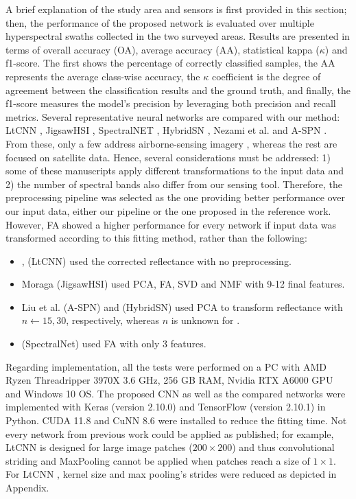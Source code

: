 A brief explanation of the study area and sensors is first provided in this section; then, the performance of the proposed network is evaluated over multiple hyperspectral swaths collected in the two surveyed areas. Results are presented in terms of overall accuracy (OA), average accuracy (AA), statistical kappa ($\kappa$) and f1-score. The first shows the percentage of correctly classified samples, the AA represents the average class-wise accuracy, the $\kappa$ coefficient is the degree of agreement between the classification results and the ground truth, and finally, the f1-score measures the model's precision by leveraging both precision and recall metrics. Several representative neural networks are compared with our method: LtCNN \cite{liu_plant_2022}, JigsawHSI \cite{moraga_jigsawhsi_2022}, SpectralNET \cite{chakraborty_spectralnet_2021}, HybridSN \cite{roy_hybridsn_2020}, Nezami et al. \cite{nezami_tree_2020} and A-SPN \cite{xue_attention-based_2021}. From these, only a few address airborne-sensing imagery \cite{liu_plant_2022}, whereas the rest are focused on satellite data. Hence, several considerations must be addressed: 1) some of these manuscripts apply different transformations to the input data and 2) the number of spectral bands also differ from our sensing tool. Therefore, the preprocessing pipeline was selected as the one providing better performance over our input data, either our pipeline or the one proposed in the reference work. However, FA showed a higher performance for every network if input data was transformed according to this fitting method, rather than the following: 
\begin{itemize}
    \item \cite{nezami_tree_2020}, \cite{li_faster_2022} (LtCNN) used the corrected reflectance with no preprocessing. 
    \item Moraga \cite{moraga_jigsawhsi_2022} (JigsawHSI) used PCA, FA, SVD and NMF with 9-12 final features.
    \item Liu et al. \cite{liu_plant_2022} (A-SPN) and \cite{roy_hybridsn_2020} (HybridSN) used PCA to transform reflectance with $n \gets 15, 30$, respectively, whereas $n$ is unknown for \cite{xue_attention-based_2021}.
    \item \cite{chakraborty_spectralnet_2021} (SpectralNet) used FA with only 3 features.
\end{itemize}

Regarding implementation, all the tests were performed on a PC with AMD Ryzen Threadripper 3970X 3.6 GHz, 256 GB RAM, Nvidia RTX A6000 GPU and Windows 10 OS. The proposed CNN as well as the compared networks were implemented with Keras (version 2.10.0) and TensorFlow (version 2.10.1) in Python. CUDA 11.8 and CuNN 8.6 were installed to reduce the fitting time. Not every network from previous work could be applied as published; for example, LtCNN is designed for large image patches ($200\times200$) and thus convolutional striding and MaxPooling cannot be applied when patches reach a size of $1\times1$. For LtCNN \cite{lu_hyperspectral_2022}, kernel size and max pooling's strides were reduced as depicted in Appendix.

